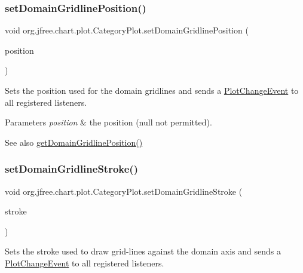 \subsubsection{\texorpdfstring{set\+Domain\+Gridline\+Position()}{setDomainGridlinePosition()}}
{\footnotesize\ttfamily void org.\+jfree.\+chart.\+plot.\+Category\+Plot.\+set\+Domain\+Gridline\+Position (\begin{DoxyParamCaption}\item[{\mbox{\hyperlink{classorg_1_1jfree_1_1chart_1_1axis_1_1_category_anchor}{Category\+Anchor}}}]{position }\end{DoxyParamCaption})}

Sets the position used for the domain gridlines and sends a \mbox{\hyperlink{}{Plot\+Change\+Event}} to all registered listeners.


\begin{DoxyParams}{Parameters}
{\em position} & the position ({\ttfamily null} not permitted).\\
\hline
\end{DoxyParams}
\begin{DoxySeeAlso}{See also}
\mbox{\hyperlink{classorg_1_1jfree_1_1chart_1_1plot_1_1_category_plot_a030d3c1500bfe6fe212be4f25e149405}{get\+Domain\+Gridline\+Position()}} 
\end{DoxySeeAlso}
\mbox{\label{classorg_1_1jfree_1_1chart_1_1plot_1_1_category_plot_adc1912c7460d4b7cfbf5cec73e21c31b}} 
\subsubsection{\texorpdfstring{set\+Domain\+Gridline\+Stroke()}{setDomainGridlineStroke()}}
{\footnotesize\ttfamily void org.\+jfree.\+chart.\+plot.\+Category\+Plot.\+set\+Domain\+Gridline\+Stroke (\begin{DoxyParamCaption}\item[{Stroke}]{stroke }\end{DoxyParamCaption})}

Sets the stroke used to draw grid-\/lines against the domain axis and sends a \mbox{\hyperlink{}{Plot\+Change\+Event}} to all registered listeners.


